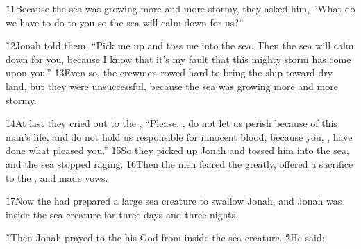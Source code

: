 \v{11}Because the sea was growing more and more stormy, they asked him, ``What do we have to do to you so the sea will calm down for us?''

\v{12}Jonah told them, ``Pick me up and toss me into the sea. Then the sea will calm down for you, because I know that it's my fault that this mighty storm has come upon you.'' \v{13}Even so, the crewmen rowed hard to bring the ship toward dry land, but they were unsuccessful, because the sea was growing more and more stormy.

\v{14}At last they cried out to the , ``Please, , do not let us perish because of this man's life, and do not hold us responsible for innocent blood, because you, , have done what pleased you.'' \v{15}So they picked up Jonah and tossed him into the sea, and the sea stopped raging. \v{16}Then the men feared the  greatly, offered a sacrifice to the , and made vows.

\v{17}Now the  had prepared a large sea creature to swallow Jonah, and Jonah was inside the sea creature for three days and three nights.

\v{1}Then Jonah prayed to the  his God from inside the sea creature. \v{2}He said:


